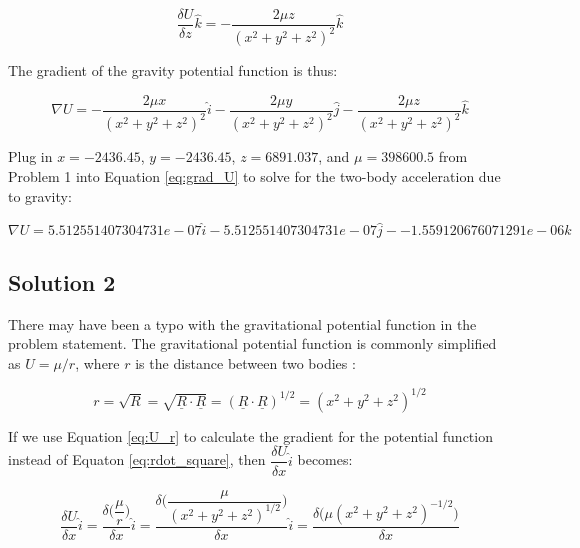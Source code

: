 \documentclass[conf]{new-aiaa}
\begin{document}
\begin{equation}
\dfrac{\delta U}{\delta z} \hat{k} = -\dfrac{2 \mu z}{ (x^2 + y^2 + z^2 )^2 } \hat{k}
\end{equation}

The gradient of the gravity potential function is thus: 

\begin{equation}
\nabla U = -\dfrac{2 \mu x}{ (x^2 + y^2 + z^2 )^2 } \hat{i} -\dfrac{2 \mu y}{ (x^2 + y^2 + z^2 )^2 } \hat{j} -\dfrac{2 \mu z}{ (x^2 + y^2 + z^2 )^2 } \hat{k}
\label{eq:grad_U}
\end{equation}

Plug in $x = -2436.45$, $y = -2436.45$, $z = 6891.037$, and $\mu = 398600.5$ from Problem 1 into Equation \ref{eq:grad_U} to solve for the two-body acceleration due to gravity: 

\begin{equation}
\nabla U = 5.512551407304731e-07 \hat{i} - 5.512551407304731e-07 \hat{j} - -1.559120676071291e-06 \hat{k} 
\end{equation}

\subsection{Solution 2}

There may have been a typo with the gravitational potential function in the problem statement. The gravitational potential function is commonly simplified as $U = \mu/r$, where $r$ is the distance between two bodies \cite{bate_astrodynamics}: 

\begin{equation}
r = \sqrt{R} = \sqrt{\underline{R} \cdot \underline{R}} = ( \underline{R} \cdot \underline{R} )^{1/2} = ( x^2 + y^2 + z^2 )^{1/2}
\label{eq:U_r}
\end{equation}

If we use Equation \ref{eq:U_r} to calculate the gradient for the potential function instead of Equaton \ref{eq:rdot_square}, then $\dfrac{\delta U}{\delta x} \hat{i}$ becomes: 

\begin{equation}
\frac{\delta U}{\delta x} \hat{i} = 
\dfrac{\delta \Big( \dfrac{\mu}{r} \Big) }{\delta x} \hat{i} = 
\dfrac{ \delta \Big( \dfrac{\mu}{ ( x^2 + y^2 + z^2 )^{1/2} } \Big) }{\delta x} \hat{i} = 
\dfrac{\delta \big( \mu ( x^2 + y^2 + z^2 )^{-1/2} \big) }{ \delta x }
\end{equation}
\end{document}

